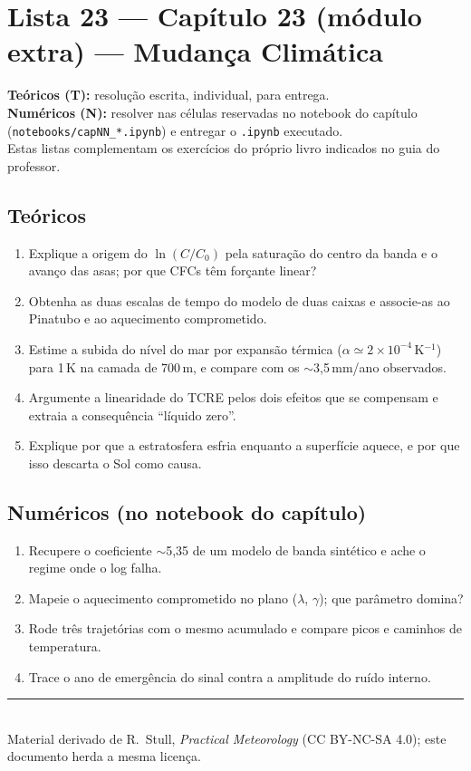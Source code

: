 \documentclass[11pt]{article}
\newcommand{\instrucoes}{%
\begin{caixalista}
\textbf{Teóricos (T):} resolução escrita, individual, para entrega.\\
\textbf{Numéricos (N):} resolver nas células reservadas no notebook do
capítulo (\texttt{notebooks/capNN\_*.ipynb}) e entregar o
\texttt{.ipynb} executado.\\
Estas listas complementam os exercícios do próprio livro indicados no
guia do professor.
\end{caixalista}}
\begin{document}
\clearpage
\section*{Lista 23 --- Capítulo 23 (módulo extra) --- Mudança Climática}
\instrucoes

\subsection*{Teóricos}

\begin{enumerate}[label=\textbf{T\arabic*.},itemsep=4pt]
  \item Explique a origem do $\ln(C/C_0)$ pela saturação do centro da
        banda e o avanço das asas; por que CFCs têm forçante linear?
  \item Obtenha as duas escalas de tempo do modelo de duas caixas e
        associe-as ao Pinatubo e ao aquecimento comprometido.
  \item Estime a subida do nível do mar por expansão térmica
        ($\alpha \simeq 2\times10^{-4}$\,K$^{-1}$) para 1\,K na
        camada de 700\,m, e compare com os $\sim$3,5\,mm/ano
        observados.
  \item Argumente a linearidade do TCRE pelos dois efeitos que se
        compensam e extraia a consequência ``líquido zero''.
  \item Explique por que a estratosfera esfria enquanto a superfície
        aquece, e por que isso descarta o Sol como causa.
\end{enumerate}

\subsection*{Numéricos (no notebook do capítulo)}

\begin{enumerate}[label=\textbf{N\arabic*.},itemsep=4pt]
  \item Recupere o coeficiente $\sim$5,35 de um modelo de banda
        sintético e ache o regime onde o log falha.
  \item Mapeie o aquecimento comprometido no plano
        ($\lambda$, $\gamma$); que parâmetro domina?
  \item Rode três trajetórias com o mesmo acumulado e compare picos e
        caminhos de temperatura.
  \item Trace o ano de emergência do sinal contra a amplitude do
        ruído interno.
\end{enumerate}

\vspace{1em}
\noindent\rule{\linewidth}{0.4pt}\\
{\scriptsize Material derivado de R.~Stull, \emph{Practical Meteorology}
(CC BY-NC-SA 4.0); este documento herda a mesma licença.}
\end{document}
